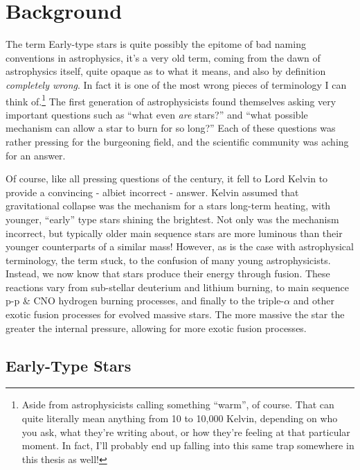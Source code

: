 \chapter{Background}
\label{ch:background}

The term Early-type stars is quite possibly the epitome of bad naming conventions in astrophysics, it's a very old term, coming from the dawn of astrophysics itself, quite opaque as to what it means, and also by definition \textit{completely wrong}. In fact it is one of the most wrong pieces of terminology I can think of.\footnote{Aside from astrophysicists calling something ``warm'', of course. That can quite literally mean anything from 10 to 10,000 Kelvin, depending on who you ask, what they're writing about, or how they're feeling at that particular moment. In fact, I'll probably end up falling into this same trap somewhere in this thesis as well!}
The first generation of astrophysicists found themselves asking very important questions such as ``what even \textit{are} stars?'' and ``what possible mechanism can allow a star to burn for so long?'' Each of these questions was rather pressing for the burgeoning field, and the scientific community was aching for an answer.

Of course, like all pressing questions of the  century, it fell to Lord Kelvin to provide a convincing - albiet incorrect - answer.
Kelvin assumed that gravitational collapse was the mechanism for a stars long-term heating, with younger, ``early'' type stars shining the brightest.
Not only was the mechanism incorrect, but typically older main sequence stars are more luminous than their younger counterparts of a similar mass!
However, as is the case with astrophysical terminology, the term stuck, to the confusion of many young astrophysicists.
Instead, we now know that stars produce their energy through fusion.
These reactions vary from sub-stellar deuterium and lithium burning, to main sequence p-p \& CNO hydrogen burning processes, and finally to the triple-$\alpha$ and other exotic fusion processes for evolved massive stars.
The more massive the star the greater the internal pressure, allowing for more exotic fusion processes.

\section{Early-Type Stars}
\label{sec:earlytype}
\label{sec:obtype}

